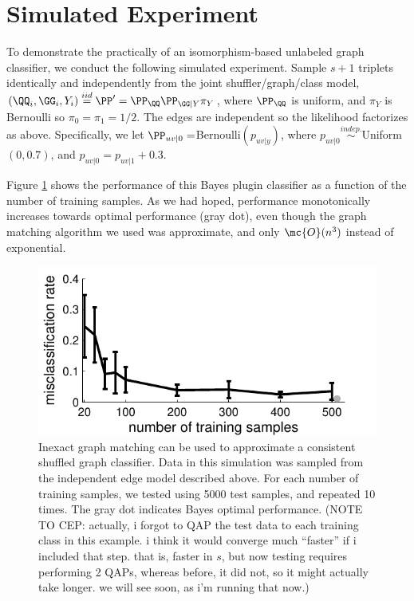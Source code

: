 \documentclass[10pt,journal,cspaper,compsoc]{IEEEtran}
\begin{document}
\section{Simulated Experiment} %
\label{sec:simulated_experiment}

To demonstrate the practically of an isomorphism-based unlabeled graph classifier, we conduct the following simulated experiment. Sample $s+1$ triplets identically and independently from the joint shuffler/graph/class model, $(\QQ_i,\GG_i,Y_i)\overset{iid}{=}\PP'=\PP_{\QQ}\PP_{\GG|Y} \pi_Y$, where $\PP_{\QQ}$ is uniform, and $\pi_Y$ is Bernoulli so $\pi_0=\pi_1=1/2$.  The edges are independent so the likelihood factorizes as above.  Specifically, we let $\PP_{uv|0}=$Bernoulli$(p_{uv|y})$, where $p_{uv|0} \overset{indep.}{\sim}$Uniform$(0,0.7)$, and $p_{uv|0}=p_{uv|1}+0.3$.  


Figure \ref{fig:1} shows the performance of this Bayes plugin classifier as a function of the number of training samples.  As we had hoped, performance monotonically increases towards optimal performance (gray dot), even though the graph matching algorithm we used was approximate, and only $\mc{O}(n^3)$ instead of exponential.

\begin{figure}[htbp]
	\centering
		\includegraphics[width=1.0\linewidth]{../figs/hetero_easy_n10_MC5000_QAP_vs_n.pdf}
	\caption{Inexact graph matching can be used to approximate a consistent shuffled graph classifier.  Data in this simulation was sampled from the independent edge model described above.  For each number of training samples, we tested using 5000 test samples, and repeated 10 times.  The gray dot indicates Bayes optimal performance. (NOTE TO CEP: actually, i forgot to QAP the test data to each training class in this example.  i think it would converge much ``faster'' if i included that step. that is, faster in $s$, but now testing requires performing 2 QAPs, whereas before, it did not, so it might actually take longer.  we will see soon, as i'm running that now.)}
	\label{fig:1}
\end{figure}
\end{document}
